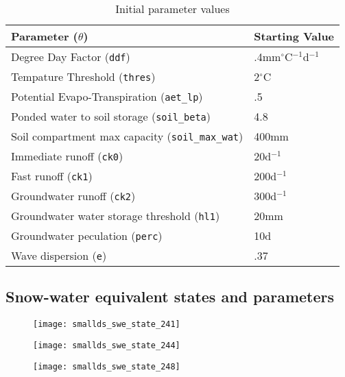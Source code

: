 \begin{table}[]
\caption{Initial parameter values} 
\begin{tabular}{ll}
Parameter ($\theta$) & Starting Value \\ \hline
Degree Day Factor (\texttt{ddf})                 & .4mm$^\circ$C$^{-1}$d$^{-1}$ \\
Tempature Threshold (\texttt{thres})                & 2$^\circ$C \\
Potential Evapo-Transpiration (\texttt{aet\_lp})              & .5\\
Ponded water to soil storage (\texttt{soil\_beta})          & 4.8 \\
Soil compartment max capacity (\texttt{soil\_max\_wat})       & 400mm \\
Immediate runoff (\texttt{ck0})       & 20d$^{-1}$ \\
Fast runoff (\texttt{ck1})      & 200d$^{-1}$ \\
Groundwater runoff (\texttt{ck2})       & 300d$^{-1}$ \\
Groundwater water storage threshold (\texttt{hl1})       & 20mm \\
Groundwater peculation (\texttt{perc})       & 10d \\
Wave dispersion (\texttt{e})       & .37 \\
\end{tabular}
\label{tab:t_param_initial}
\end{table}

\subsection{Snow-water equivalent states and parameters}

\begin{figure}
\centering
\begin{minipage}{.33\textwidth}
  \centering
  \texttt{[image: smallds\_swe\_state\_241]}
  \label{fig:241swe}
\end{minipage}%
\begin{minipage}{.33\textwidth}
  \centering
  \texttt{[image: smallds\_swe\_state\_244]}
  \label{fig:244swe}
\end{minipage}
\begin{minipage}{.33\textwidth}
  \centering
  \texttt{[image: smallds\_swe\_state\_248]}
  \label{fig:248swe}
\end{minipage}
\label{fig:swe_state_small}
\end{figure}


